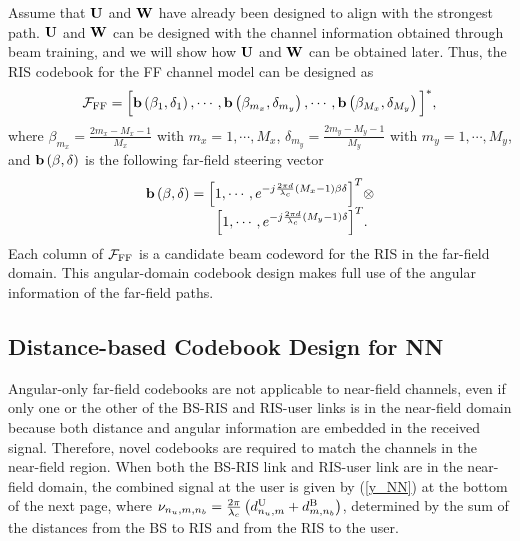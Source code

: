 \documentclass[lettersize, journal]{IEEEtran}
\begin{document}
Assume that ${\bf{U}}$ and ${\bf{W}}$ have already been designed to align with the strongest path.
${\bf{U}}$ and ${\bf{W}}$ can be designed with the channel information obtained through beam training, and we will show how ${\bf{U}}$ and ${\bf{W}}$ can be obtained later.
Thus, the RIS codebook for the FF channel model can be designed as  {\cite{LWC.2020.3005980}} {\cite{JCC.2022.06.015}}
\begin{equation}\label{Codebook_FFC}
\begin{array}{l}
{\cal{F}}_{\rm{FF}}=\Big[ {\bf{b}}\left( \beta_1, \delta_1 \right), \cdots, {\bf{b}}\left( \beta_{m_x}, \delta_{m_y} \right), \cdots, {\bf{b}}\left( \beta_{M_x}, \delta_{M_y} \right) \Big]^*,
\end{array}
\end{equation}
where $\beta_{m_x} = \frac{2{m_x}-{M_x}-1}{M_x}$ with ${m_x} = 1, \cdots, {M_x}$,  $\delta_{m_y} = \frac{2{m_y}-{M_y}-1}{M_y}$ with ${m_y} = 1, \cdots, {M_y}$, and ${{\bf{b}}}\left( {\beta, \delta } \right)$ is the following far-field steering vector
\begin{equation}\label{steering_FFC}
\begin{array}{l}
{{\bf{b}}}\left( {\beta, \delta } \right) = \Big[ 1, \cdots ,{e^{-j\frac{{2\pi d}}{\lambda_c }{\left( {{M_x} - 1} \right) \beta  \delta} }} \Big]^T  \otimes  \\
\;\;\;\;\;\;\;\;\;\;\;\;\;\;\;\;\;\; {\Big[ 1, \cdots ,e^{-j\frac{{2\pi d}}{\lambda_c } { \left( {{M_y} - 1} \right) \delta } }} \Big]^T. 
\end{array}
\end{equation}
Each column of ${\cal{F}}_{\rm{FF}}$ is a candidate beam codeword for the RIS in the far-field domain. 
This angular-domain codebook design makes full use of the angular information of the far-field paths.


\subsection{ Distance-based Codebook Design for NN }

Angular-only far-field codebooks are not applicable to near-field channels, even if only one or the other of the BS-RIS and RIS-user links is in the near-field domain because both distance and angular information are embedded in the received signal. 
Therefore, novel codebooks are required to match the channels in the near-field region. 
When both the BS-RIS link and RIS-user link are in the near-field domain, the combined signal at the user is given by (\ref{y_NN}) at the bottom of the next page, 
where $\nu_{n_u, m, n_b} =  \frac{{2\pi }}{\lambda_c }\left( d_{n_u, m}^{\rm{U}} + d_{m, n_b}^{\rm{B}}\right)$, determined by the sum of the distances from the BS to RIS and from the RIS to the user.
\end{document}
